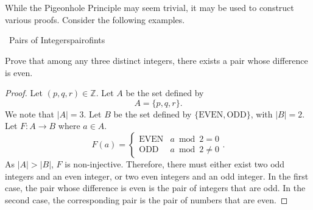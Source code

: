         \vphantom
        \\
        \\
        While the Pigeonhole Principle may seem trivial, it may be used to construct various proofs. Consider the following examples.
        \begin{example}{\Difficulty\,\Difficulty\,\,Pairs of Integers}{pairofints}
        
            Prove that among any three distinct integers, there exists a pair whose difference is even.
            \begin{proof}
                Let \((p,q,r)\in\mathbb{Z}\). Let \(A\) be the set defined by
                \begin{equation*}
                    A=\{p,q,r\}.
                \end{equation*}
                We note that \(|A|=3\). Let \(B\) be the set defined by \(\{\text{EVEN},\text{ODD}\}\), with \(|B|=2\). Let \(F:A\to B\) where \(a\in A\).
                \begin{equation*}
                    F(a)=\begin{cases} \text{EVEN} & a\bmod 2 = 0 \\ \text{ODD} & a\bmod 2 \neq 0 \end{cases}.
                \end{equation*}
                As \(|A|>|B|\), \(F\) is non-injective. Therefore, there must either exist two odd integers and an even integer, or two even integers and an odd integer. In the first case, the pair whose difference is even is the pair of integers that are odd. In the second case, the corresponding pair is the pair of numbers that are even.
            \end{proof}
        
        \end{example}
        \pagebreak
